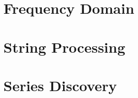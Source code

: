 \documentclass[11pt,color=green,table]{elegantbook}
\begin{document}
\chapter{Frequency Domain}








\chapter{String Processing}





\chapter{Series Discovery}


\end{document}
